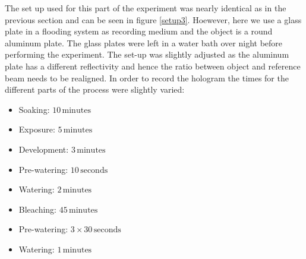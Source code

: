 The set up used for this part of the experiment was nearly identical as in the previous section and can be seen in figure \ref{setup3}. Hoewever, here we use a glass plate in a flooding system as recording medium and the object is a round aluminum plate. 
The glass plates were left in a water bath over night before performing the experiment. The set-up was slightly adjusted as the aluminum plate has a different reflectivity and hence the ratio  between object and reference beam needs to be realigned. In order to record the hologram the times for the different parts of the process were slightly varied:

\begin{itemize}
	\item Soaking:  $10\,\mathrm{minutes}$
	\item Exposure: $5\,\mathrm{minutes}$
	\item Development: $3\,\mathrm{minutes}$
	\item Pre-watering: $10\,\mathrm{seconds}$
	\item Watering: $2\,\mathrm{minutes}$
	\item Bleaching: $45\,\mathrm{minutes}$
	\item Pre-watering: $3 \times 30\,\mathrm{seconds}$
	\item Watering: $1\,\mathrm{minutes}$
\end{itemize}

